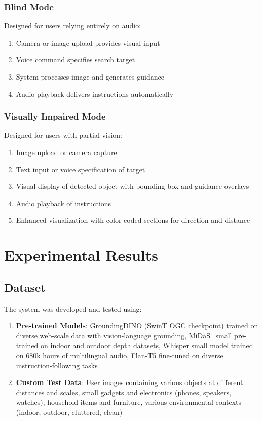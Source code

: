 \documentclass{article}
\begin{document}
\subsubsection{Blind Mode}

Designed for users relying entirely on audio:
\begin{enumerate}
    \item Camera or image upload provides visual input
    \item Voice command specifies search target
    \item System processes image and generates guidance
    \item Audio playback delivers instructions automatically
\end{enumerate}

\subsubsection{Visually Impaired Mode}

Designed for users with partial vision:
\begin{enumerate}
    \item Image upload or camera capture
    \item Text input or voice specification of target
    \item Visual display of detected object with bounding box and guidance overlays
    \item Audio playback of instructions
    \item Enhanced visualization with color-coded sections for direction and distance
\end{enumerate}

\section{Experimental Results}

\subsection{Dataset}

The system was developed and tested using:

\begin{enumerate}
    \item \textbf{Pre-trained Models}: GroundingDINO (SwinT OGC checkpoint) trained on diverse web-scale data with vision-language grounding, MiDaS\_small pre-trained on indoor and outdoor depth datasets, Whisper small model trained on 680k hours of multilingual audio, Flan-T5 fine-tuned on diverse instruction-following tasks
    \item \textbf{Custom Test Data}: User images containing various objects at different distances and scales, small gadgets and electronics (phones, speakers, watches), household items and furniture, various environmental contexts (indoor, outdoor, cluttered, clean)
\end{enumerate}
\end{document}
